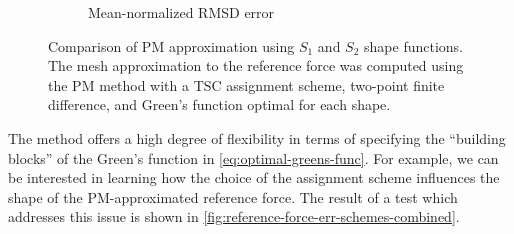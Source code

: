 \begin{figure}[htp]
\begin{subfigure}[b]{0.48\textwidth}
        \caption{Mean-normalized RMSD error}
        \label{fig:reference-force-error-sub}
    \end{subfigure}
    \caption{Comparison of PM approximation using $S_1$ and $S_2$ shape functions.
        The mesh approximation to the reference force was computed using the PM method with a TSC assignment scheme, two-point finite difference, and Green's function optimal for each shape.
    }
    \label{fig:reference-force-combined}
\end{figure}

The \PThreeM{} method offers a high degree of flexibility in terms of specifying the ``building blocks'' of the Green's function in \autoref{eq:optimal-greens-func}.
For example, we can be interested in learning how the choice of the assignment scheme influences the shape of the PM-approximated reference force.
The result of a test which addresses this issue is shown in \autoref{fig:reference-force-err-schemes-combined}.
